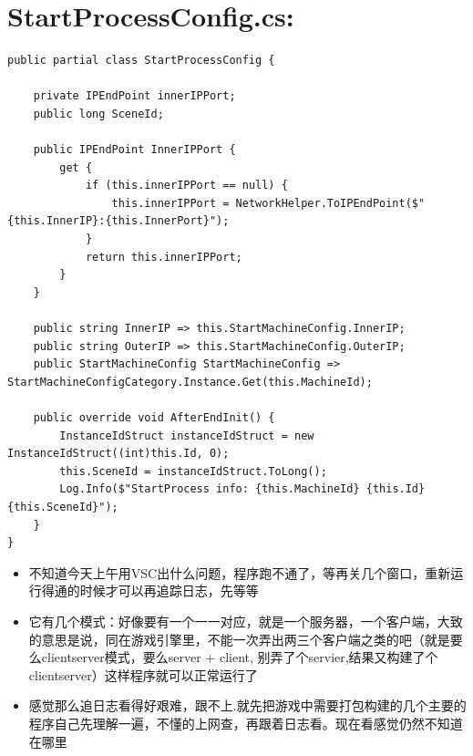 \documentclass[9pt, b5paper]{article}
\begin{document}
\section{StartProcessConfig.cs:}
\label{sec-20}
\begin{verbatim}
public partial class StartProcessConfig {

    private IPEndPoint innerIPPort;
    public long SceneId;

    public IPEndPoint InnerIPPort {
        get {
            if (this.innerIPPort == null) {
                this.innerIPPort = NetworkHelper.ToIPEndPoint($"{this.InnerIP}:{this.InnerPort}");
            }
            return this.innerIPPort;
        }
    }

    public string InnerIP => this.StartMachineConfig.InnerIP;
    public string OuterIP => this.StartMachineConfig.OuterIP;
    public StartMachineConfig StartMachineConfig => StartMachineConfigCategory.Instance.Get(this.MachineId);

    public override void AfterEndInit() {
        InstanceIdStruct instanceIdStruct = new InstanceIdStruct((int)this.Id, 0);
        this.SceneId = instanceIdStruct.ToLong();
        Log.Info($"StartProcess info: {this.MachineId} {this.Id} {this.SceneId}");
    }
}
\end{verbatim}
\begin{itemize}
\item 不知道今天上午用VSC出什么问题，程序跑不通了，等再关几个窗口，重新运行得通的时候才可以再追踪日志，先等等
\item 它有几个模式：好像要有一个一一对应，就是一个服务器，一个客户端，大致的意思是说，同在游戏引擎里，不能一次弄出两三个客户端之类的吧（就是要么clientserver模式，要么server + client, 别弄了个servier,结果又构建了个clientserver）这样程序就可以正常运行了
\item 感觉那么追日志看得好艰难，跟不上.就先把游戏中需要打包构建的几个主要的程序自己先理解一遍，不懂的上网查，再跟着日志看。现在看感觉仍然不知道在哪里
\end{itemize}
\end{document}
